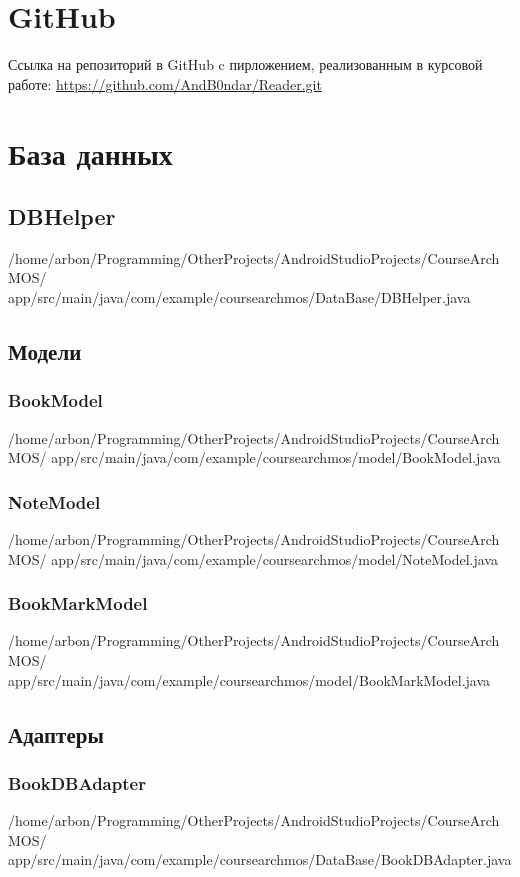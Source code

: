 \chapter{GitHub}
Ссылка на репозиторий в GitHub c пирложением, реализованным в курсовой работе:
\url{https://github.com/AndB0ndar/Reader.git}

\chapter{База данных}
\section{DBHelper}\label{lst:db:helper}

{/home/arbon/Programming/OtherProjects/AndroidStudioProjects/CourseArchMOS/%
app/src/main/java/com/example/coursearchmos/DataBase/DBHelper.java}

\section{Модели}
\subsection{BookModel}\label{lst:db:model:book}

{/home/arbon/Programming/OtherProjects/AndroidStudioProjects/CourseArchMOS/%
app/src/main/java/com/example/coursearchmos/model/BookModel.java}

\subsection{NoteModel}\label{lst:db:model:note}

{/home/arbon/Programming/OtherProjects/AndroidStudioProjects/CourseArchMOS/%
app/src/main/java/com/example/coursearchmos/model/NoteModel.java}

\subsection{BookMarkModel}\label{lst:db:model:bookmark}

{/home/arbon/Programming/OtherProjects/AndroidStudioProjects/CourseArchMOS/%
app/src/main/java/com/example/coursearchmos/model/BookMarkModel.java}

\section{Адаптеры}
\subsection{BookDBAdapter}\label{lst:db:adapter:book}

{/home/arbon/Programming/OtherProjects/AndroidStudioProjects/CourseArchMOS/%
app/src/main/java/com/example/coursearchmos/DataBase/BookDBAdapter.java}

